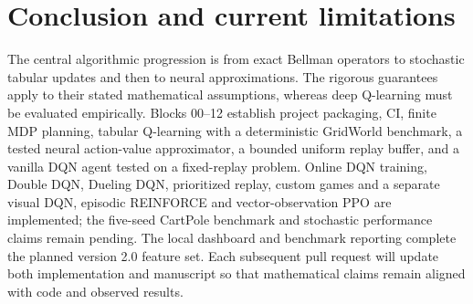 \documentclass[11pt,a4paper]{article}
\begin{document}
\section{Conclusion and current limitations}
The central algorithmic progression is from exact Bellman operators to stochastic tabular updates and then to neural approximations. The rigorous guarantees apply to their stated mathematical assumptions, whereas deep Q-learning must be evaluated empirically. Blocks 00--12 establish project packaging, CI, finite MDP planning, tabular Q-learning with a deterministic GridWorld benchmark, a tested neural action-value approximator, a bounded uniform replay buffer, and a vanilla DQN agent tested on a fixed-replay problem. Online DQN training, Double DQN, Dueling DQN, prioritized replay, custom games and a separate visual DQN, episodic REINFORCE and vector-observation PPO are implemented; the five-seed CartPole benchmark and stochastic performance claims remain pending. The local dashboard and benchmark reporting complete the planned version 2.0 feature set. Each subsequent pull request will update both implementation and manuscript so that mathematical claims remain aligned with code and observed results.
\end{document}
